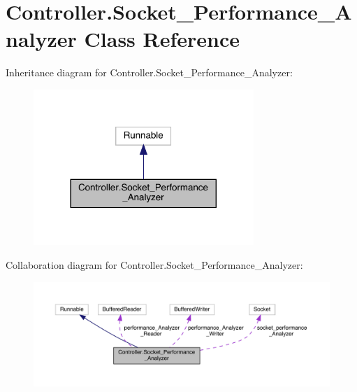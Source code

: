 \hypertarget{class_controller_1_1_socket___performance___analyzer}{}\section{Controller.\+Socket\+\_\+\+Performance\+\_\+\+Analyzer Class Reference}
\label{class_controller_1_1_socket___performance___analyzer}


Inheritance diagram for Controller.\+Socket\+\_\+\+Performance\+\_\+\+Analyzer\+:
\nopagebreak
\begin{figure}[H]
\begin{center}
\leavevmode
\includegraphics[width=236pt]{class_controller_1_1_socket___performance___analyzer__inherit__graph}
\end{center}
\end{figure}


Collaboration diagram for Controller.\+Socket\+\_\+\+Performance\+\_\+\+Analyzer\+:
\nopagebreak
\begin{figure}[H]
\begin{center}
\leavevmode
\includegraphics[width=350pt]{class_controller_1_1_socket___performance___analyzer__coll__graph}
\end{center}
\end{figure}
